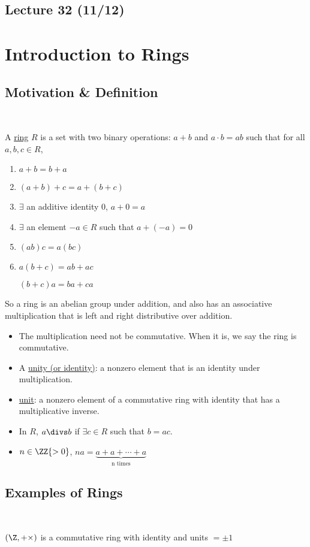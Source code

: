 \subsection*{Lecture 32 (11/12)} %
\section{Introduction to Rings}
\subsection{Motivation \& Definition}\
\begin{definition}[Ring]
  A \ul{ring} \(R\) is a set with two binary operations: \(a+b\) and \(a\cdot b=ab\) such that for all \(a,b,c\in R\),
  \begin{enumerate}
    \item \(a+b = b+a\)
    \item \((a+b)+c = a+(b+c)\)
    \item \(\exists\) an additive identity \(0\), \(a+0 = a\)
    \item \(\exists\) an element \(-a\in R\) such that \(a+(-a)=0\)
    \item \((ab)c = a(bc)\)
    \item \(a(b+c) = ab+ac\)

    \((b+c)a = ba+ca\)
  \end{enumerate}
\end{definition}

So a ring is an abelian group under addition, and also has an associative multiplication that is left and right distributive over addition.
\begin{itemize}
  \item The multiplication need not be commutative. When it is, we say the ring is commutative.
  \item A \ul{unity (or identity)}: a nonzero element that is an identity under multiplication.
  \item \ul{unit}: a nonzero element of a commutative ring with identity that has a multiplicative inverse.
  \item In \(R\), \(a\divs b\) if \(\exists c\in R\) such that \(b=ac\).
  \item \(n\in \ZZ{>0}\), \(na = \underbrace{a+a+\cdots+a}_{\text{n times}}\)
\end{itemize}

\subsection{Examples of Rings}\
\begin{example}
  \((\Z, +\times)\) is a commutative ring with identity and units \(=\pm 1\)
\end{example}

